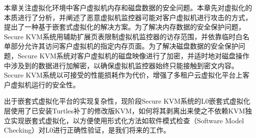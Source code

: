 本章关注虚拟化环境中客户虚拟机内存和磁盘数据的安全问题。本章先对虚拟化的本质进行了分析，并阐述了恶意虚拟机监控器可能对客户虚拟机进行攻击的方式，提出了一种基于嵌套式虚拟化的解决方案。为了解决内存数据的安全保护问题，Secure KVM系统用辅助扩展页表限制虚拟机监控器的访存范围，并依靠临时白名单部分允许其访问客户虚拟机的指定内存页面。为了解决磁盘数据的安全保护问题，Secure KVM系统对客户虚拟机的磁盘映像进行了加密，并适时地对磁盘操作中涉及到的数据进行加解密，以确保虚拟机监控器始终只能接触到密文内容。Secure KVM系统以可接受的性能损耗作为代价，增强了多租户云虚拟化平台上客户虚拟机运行的安全性。

出于嵌套式虚拟化平台的实现复杂性，现阶段Secure KVM系统的L0嵌套式虚拟化层使用了已安装Turtles补丁的修改版KVM，如何将其剥离出来使之不依赖KVM独立实现嵌套式虚拟化，以方便使用形式化方法如软件模式检查（Software Model Checking）对L0进行正确性验证，是我们将来的工作。